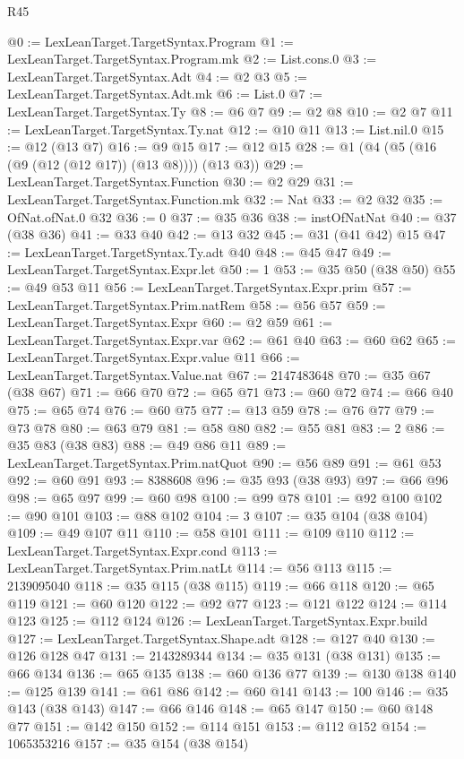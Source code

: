 \begin{lexlean}{R45}
\begin{coremodule}
@0 := LexLeanTarget.TargetSyntax.Program
@1 := LexLeanTarget.TargetSyntax.Program.mk
@2 := List.cons.{0}
@3 := LexLeanTarget.TargetSyntax.Adt
@4 := @2 @3
@5 := LexLeanTarget.TargetSyntax.Adt.mk
@6 := List.{0}
@7 := LexLeanTarget.TargetSyntax.Ty
@8 := @6 @7
@9 := @2 @8
@10 := @2 @7
@11 := LexLeanTarget.TargetSyntax.Ty.nat
@12 := @10 @11
@13 := List.nil.{0}
@15 := @12 (@13 @7)
@16 := @9 @15
@17 := @12 @15
@28 := @1 (@4 (@5 (@16 (@9 (@12 (@12 @17)) (@13 @8)))) (@13 @3))
@29 := LexLeanTarget.TargetSyntax.Function
@30 := @2 @29
@31 := LexLeanTarget.TargetSyntax.Function.mk
@32 := Nat
@33 := @2 @32
@35 := OfNat.ofNat.{0} @32
@36 := 0
@37 := @35 @36
@38 := instOfNatNat
@40 := @37 (@38 @36)
@41 := @33 @40
@42 := @13 @32
@45 := @31 (@41 @42) @15
@47 := LexLeanTarget.TargetSyntax.Ty.adt @40
@48 := @45 @47
@49 := LexLeanTarget.TargetSyntax.Expr.let
@50 := 1
@53 := @35 @50 (@38 @50)
@55 := @49 @53 @11
@56 := LexLeanTarget.TargetSyntax.Expr.prim
@57 := LexLeanTarget.TargetSyntax.Prim.natRem
@58 := @56 @57
@59 := LexLeanTarget.TargetSyntax.Expr
@60 := @2 @59
@61 := LexLeanTarget.TargetSyntax.Expr.var
@62 := @61 @40
@63 := @60 @62
@65 := LexLeanTarget.TargetSyntax.Expr.value @11
@66 := LexLeanTarget.TargetSyntax.Value.nat
@67 := 2147483648
@70 := @35 @67 (@38 @67)
@71 := @66 @70
@72 := @65 @71
@73 := @60 @72
@74 := @66 @40
@75 := @65 @74
@76 := @60 @75
@77 := @13 @59
@78 := @76 @77
@79 := @73 @78
@80 := @63 @79
@81 := @58 @80
@82 := @55 @81
@83 := 2
@86 := @35 @83 (@38 @83)
@88 := @49 @86 @11
@89 := LexLeanTarget.TargetSyntax.Prim.natQuot
@90 := @56 @89
@91 := @61 @53
@92 := @60 @91
@93 := 8388608
@96 := @35 @93 (@38 @93)
@97 := @66 @96
@98 := @65 @97
@99 := @60 @98
@100 := @99 @78
@101 := @92 @100
@102 := @90 @101
@103 := @88 @102
@104 := 3
@107 := @35 @104 (@38 @104)
@109 := @49 @107 @11
@110 := @58 @101
@111 := @109 @110
@112 := LexLeanTarget.TargetSyntax.Expr.cond
@113 := LexLeanTarget.TargetSyntax.Prim.natLt
@114 := @56 @113
@115 := 2139095040
@118 := @35 @115 (@38 @115)
@119 := @66 @118
@120 := @65 @119
@121 := @60 @120
@122 := @92 @77
@123 := @121 @122
@124 := @114 @123
@125 := @112 @124
@126 := LexLeanTarget.TargetSyntax.Expr.build
@127 := LexLeanTarget.TargetSyntax.Shape.adt
@128 := @127 @40
@130 := @126 @128 @47
@131 := 2143289344
@134 := @35 @131 (@38 @131)
@135 := @66 @134
@136 := @65 @135
@138 := @60 @136 @77
@139 := @130 @138
@140 := @125 @139
@141 := @61 @86
@142 := @60 @141
@143 := 100
@146 := @35 @143 (@38 @143)
@147 := @66 @146
@148 := @65 @147
@150 := @60 @148 @77
@151 := @142 @150
@152 := @114 @151
@153 := @112 @152
@154 := 1065353216
@157 := @35 @154 (@38 @154)

\end{coremodule}
\end{lexlean}
